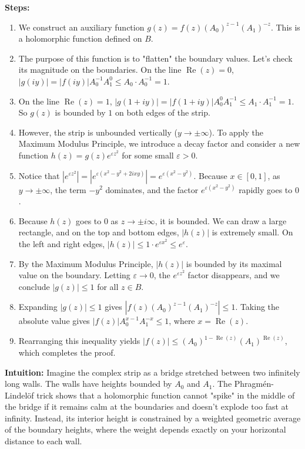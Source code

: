\begin{solution}
\textbf{Steps:}
\begin{enumerate}
    \item We construct an auxiliary function $g(z) = f(z) (A_0)^{z-1} (A_1)^{-z}$. This is a holomorphic function defined on $B$.
    \item The purpose of this function is to "flatten" the boundary values. Let's check its magnitude on the boundaries. On the line $\operatorname{Re}(z) = 0$, $|g(iy)| = |f(iy)| A_0^{-1} A_1^0 \leq A_0 \cdot A_0^{-1} = 1$.
    \item On the line $\operatorname{Re}(z) = 1$, $|g(1+iy)| = |f(1+iy)| A_0^0 A_1^{-1} \leq A_1 \cdot A_1^{-1} = 1$. So $g(z)$ is bounded by $1$ on both edges of the strip.
    \item However, the strip is unbounded vertically ($y \to \pm\infty$). To apply the Maximum Modulus Principle, we introduce a decay factor and consider a new function $h(z) = g(z) e^{\varepsilon z^2}$ for some small $\varepsilon > 0$.
    \item Notice that $|e^{\varepsilon z^2}| = |e^{\varepsilon (x^2 - y^2 + 2ixy)}| = e^{\varepsilon(x^2 - y^2)}$. Because $x \in [0,1]$, as $y \to \pm\infty$, the term $-y^2$ dominates, and the factor $e^{\varepsilon(x^2 - y^2)}$ rapidly goes to $0$.
    \item Because $h(z)$ goes to $0$ as $z \to \pm i\infty$, it is bounded. We can draw a large rectangle, and on the top and bottom edges, $|h(z)|$ is extremely small. On the left and right edges, $|h(z)| \leq 1 \cdot e^{\varepsilon x^2} \leq e^\varepsilon$.
    \item By the Maximum Modulus Principle, $|h(z)|$ is bounded by its maximal value on the boundary. Letting $\varepsilon \to 0$, the $e^{\varepsilon z^2}$ factor disappears, and we conclude $|g(z)| \leq 1$ for all $z \in B$.
    \item Expanding $|g(z)| \leq 1$ gives $|f(z) (A_0)^{z-1} (A_1)^{-z}| \leq 1$. Taking the absolute value gives $|f(z)| A_0^{x-1} A_1^{-x} \leq 1$, where $x = \operatorname{Re}(z)$.
    \item Rearranging this inequality yields $|f(z)| \leq (A_0)^{1-\operatorname{Re}(z)} (A_1)^{\operatorname{Re}(z)}$, which completes the proof.
\end{enumerate}

\textbf{Intuition:}
Imagine the complex strip as a bridge stretched between two infinitely long walls. The walls have heights bounded by $A_0$ and $A_1$. The Phragmén-Lindelöf trick shows that a holomorphic function cannot "spike" in the middle of the bridge if it remains calm at the boundaries and doesn't explode too fast at infinity. Instead, its interior height is constrained by a weighted geometric average of the boundary heights, where the weight depends exactly on your horizontal distance to each wall.
\end{solution}

